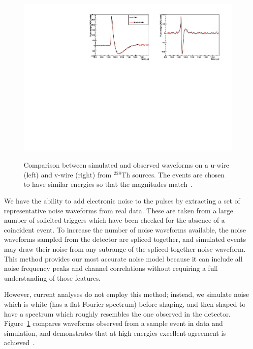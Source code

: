 \begin{figure}
\begin{center}
\includegraphics[keepaspectratio=true,width=\textwidth]{pulse_comp.pdf}
\end{center}
\renewcommand{\baselinestretch}{1}
\small\normalsize
\begin{quote}
\caption{Comparison between simulated and observed waveforms on a u-wire (left) and v-wire (right) from $^{228}$Th sources.  The events are chosen to have similar energies so that the magnitudes match~\cite{MCDocumentRun2a}.}
\label{fig:MCPulseComparison}
\end{quote}
\end{figure}
\renewcommand{\baselinestretch}{2}
\small\normalsize

We have the ability to add electronic noise to the pulses by extracting a set of representative noise waveforms from real data.  These are taken from a large number of solicited triggers which have been checked for the absence of a coincident event.  To increase the number of noise waveforms available, the noise waveforms sampled from the detector are spliced together, and simulated events may draw their noise from any subrange of the spliced-together noise waveform.  This method provides our most accurate noise model because it can include all noise frequency peaks and channel correlations without requiring a full understanding of those features.

However, current analyses do not employ this method; instead, we simulate noise which is white (has a flat Fourier spectrum) before shaping, and then shaped to have a spectrum which roughly resembles the one observed in the detector.  Figure~\ref{fig:MCPulseComparison} compares waveforms observed from a sample event in data and simulation, and demonstrates that at high energies excellent agreement is achieved~\cite{MCDocumentRun2a}.

